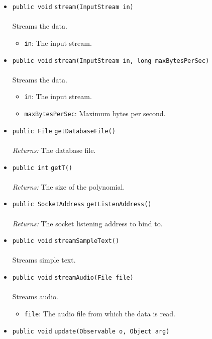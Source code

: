 \begin{itemize}
\item \lstinline|public void| \lstinline|stream|\lstinline|(InputStream in)|\\ \\[-0.6em]
Streams the data.
\begin{itemize}
\item \lstinline|in|: The input stream.
\end{itemize}



\item \lstinline|public void| \lstinline|stream|\lstinline|(InputStream in, long maxBytesPerSec)|\\ \\[-0.6em]
Streams the data.
\begin{itemize}
\item \lstinline|in|: The input stream.
\item \lstinline|maxBytesPerSec|: Maximum bytes per second.
\end{itemize}



\item \lstinline|public File| \lstinline|getDatabaseFile|\lstinline|()|\\ \\[-0.6em]
\emph{Returns:} The database file.



\item \lstinline|public int| \lstinline|getT|\lstinline|()|\\ \\[-0.6em]
\emph{Returns:} The size of the polynomial.



\item \lstinline|public SocketAddress| \lstinline|getListenAddress|\lstinline|()|\\ \\[-0.6em]
\emph{Returns:} The socket listening address to bind to.



\item \lstinline|public void| \lstinline|streamSampleText|\lstinline|()|\\ \\[-0.6em]
Streams simple text.



\item \lstinline|public void| \lstinline|streamAudio|\lstinline|(File file)|\\ \\[-0.6em]
Streams audio.
\begin{itemize}
\item \lstinline|file|: The audio file from which the data is read.
\end{itemize}



\item \lstinline|public void| \lstinline|update|\lstinline|(Observable o, Object arg)| \\[-0.6em]




\end{itemize}

